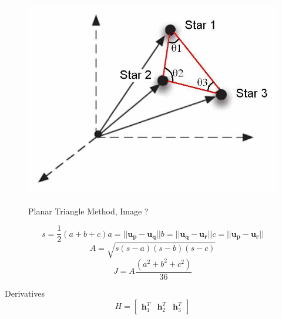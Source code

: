 \documentclass[12pt,a4paper,oneside]{article}
\begin{document}
\begin{figure}[h]
\includegraphics[scale=0.30]{planar_triangle_method.jpg}
\centering
\label{fig:planar_triangle_method}
\caption{Planar Triangle Method, Image \cite{cole2006fast}?}
\end{figure}

\cite{cole2006fast}\par

\begin{subequations}
\begin{equation}
s = \frac{1}{2}(a + b + c)
\end{equation}
\begin{equation}
a = ||\bm{u_p} - \bm{u_q}||
\end{equation}
\begin{equation}
b = ||\bm{u_q} - \bm{u_r}||
\end{equation}
\begin{equation}
c = ||\bm{u_p} - \bm{u_r}||
\end{equation}
\end{subequations}
\begin{equation}
A = \sqrt{s(s-a)(s-b)(s-c)}
\end{equation}
\begin{equation}
J = A\frac{(a^2 + b^2 + c^2)}{36}
\end{equation}

Derivatives
\begin{equation}
H = \begin{bmatrix}
\bm{h}_1^T & \bm{h}_2^T & \bm{h}_3^T
\end{bmatrix}
\end{equation}
\end{document}

